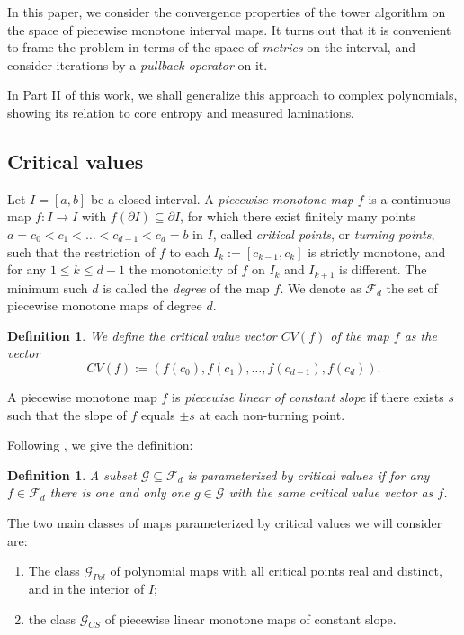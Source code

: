 \documentclass[11pt]{amsart}
\newtheorem{definition}[theorem]{Definition}
\begin{document}
In this paper, we consider the convergence properties of the tower algorithm  on the space of piecewise monotone interval maps. 
It turns out that it is convenient to frame the problem in terms of the space of \emph{metrics} on the interval, and consider iterations by a \emph{pullback operator}
on it. 

In Part II of this work, we shall generalize this approach to complex polynomials, showing its relation to core entropy and measured laminations.

\subsection{Critical values}

Let $I = [a,b]$ be a closed interval. A \emph{piecewise monotone map} $f$ is a continuous map $f : I \to I$ with $f(\partial I ) \subseteq \partial I$, for which there 
exist finitely many points 
$a = c_0 < c_1 < \dots < c_{d-1} < c_d = b$ in $I$, called \emph{critical points}, or \emph{turning points}, such that 
the restriction of $f$ to each $I_k := [c_{k-1}, c_{k}]$ is strictly monotone, and for any $1 \leq k \leq d-1$ the monotonicity of $f$ on $I_k$ and $I_{k+1}$ is different.  
The minimum such $d$ is called the \emph{degree} of the map $f$.
We denote as $\mathcal{F}_d$ the set of piecewise monotone maps of 
degree $d$.

\begin{definition}
We define the \emph{critical value vector} $CV(f)$ of the map $f$ as the vector 
$$CV(f) := (f(c_0), f(c_1), \dots, f(c_{d-1}), f(c_d)).$$
\end{definition}

A piecewise monotone map $f$ is \emph{piecewise linear of constant slope} if there exists $s$ such 
that the slope of $f$ equals $\pm s$ at each non-turning point. 

Following \cite{Mil-slides}, we give the definition:

\begin{definition}
A subset $\mathcal{G} \subseteq \mathcal{F}_d$ is \emph{parameterized by critical values} if for any $f \in \mathcal{F}_d$ 
there is one and only one $ g \in \mathcal{G}$ with the same critical value vector as $f$.
\end{definition}

The two main classes of maps parameterized by critical values we will consider are: 

\begin{enumerate}

\item The class $\mathcal{G}_{Pol}$ of polynomial maps with all critical points real and distinct, and in the interior of $I$; 

\item the class $\mathcal{G}_{CS}$ of piecewise linear monotone maps of constant slope.

\end{enumerate}
\end{document}
